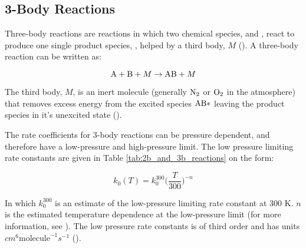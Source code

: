 \subsection{3-Body Reactions}\label{sec:3body_reactions}

Three-body reactions are reactions in which two chemical species,  and , react to produce one single product species, , helped by a third body, $M$ (\cite{Jacob1999}). A three-body reaction can be written as: 

\begin{equation*}
    \mathrm{A} + \mathrm{B} + M \rightarrow \mathrm{AB} + M
\end{equation*}


The third body, $M$, is an inert molecule (generally $\mathrm{N_2}$ or $\mathrm{O_2}$ in the atmosphere) that removes excess energy from the excited species $\mathrm{AB*}$ leaving the product species  in it's unexcited state (\cite{Jacob1999}).


\medskip





The rate coefficients for 3-body reactions can be pressure dependent, and therefore have a low-pressure and high-pressure limit. The low pressure limiting rate constants are given in Table \ref{tab:2b_and_3b_reactions} on the form: 

\begin{equation}
    k_0(T) = k_0^{300}\Big(\frac{T}{300}\Big)^{-n}    
    \label{eq:3b_low_pressure}
\end{equation}

In which $k_0^{300}$ is an estimate of the low-pressure limiting rate constant at 300 K. $n$ is the estimated temperature dependence at the low-pressure limit (for more information, see \cite{JPL}). The low pressure rate constants is of third order and has units $cm^6\text{molecule}^{-1}s^{-1}$ (\cite{AtmModFund}).

